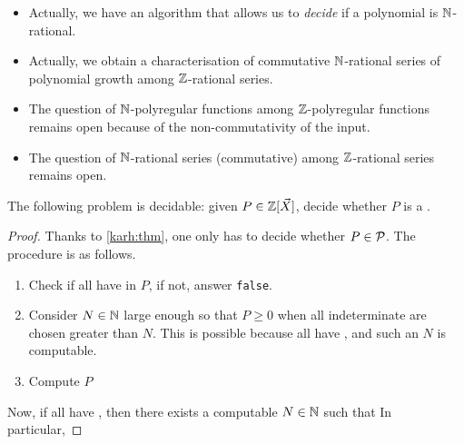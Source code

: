 \documentclass[a4paper,11pt]{article}
\begin{document}
\begin{itemize}
    \item Actually, we have an algorithm that allows
        us to \emph{decide} if a polynomial is $\mathbb{N}$-rational.
    \item Actually, we obtain a characterisation of
        commutative 
        $\mathbb{N}$-rational series of polynomial growth
        among $\mathbb{Z}$-rational series.
    \item The question of $\mathbb{N}$-polyregular functions
        among $\mathbb{Z}$-polyregular functions remains open
        because of the non-commutativity of the input.
    \item The question of $\mathbb{N}$-rational series (commutative)
        among $\mathbb{Z}$-rational series remains open.
\end{itemize}


\begin{corollary}
    The following problem is decidable: given $P \in \mathbb{Z}[\vec{X}]$,
    decide whether $P$ is a .
\end{corollary}
\begin{proof}
    Thanks to \cref{karh:thm}, one only has to decide whether
    $P \in \mathcal{P}$. The procedure is as follows.
    \begin{enumerate}
        \item Check if all  have
             in $P$, if not, answer \texttt{false}.
        \item Consider $N \in \mathbb{N}$ large enough so that
              $P \geq 0$ when all indeterminate are chosen greater
              than $N$. This is possible because all  have , and such an $N$
              is computable.
        \item Compute $P$
    \end{enumerate}

    Now, if all 
    have , then there exists a computable
    $N \in \mathbb{N}$ such that 
    In particular, 


\end{proof}
\end{document}
